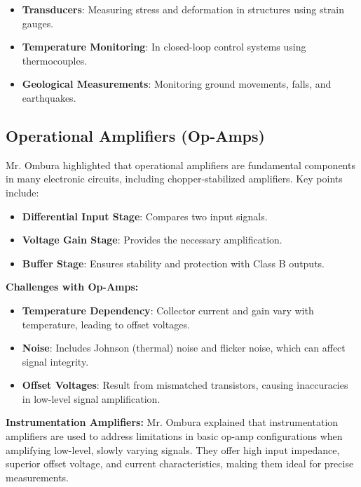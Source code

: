 \documentclass[a4paper,9pt,twoside,openany,twocolumn]{memoir}
\begin{document}
\begin{itemize}
    \item \textbf{Transducers}: Measuring stress and deformation in structures using strain gauges.
    \item \textbf{Temperature Monitoring}: In closed-loop control systems using thermocouples.
    \item \textbf{Geological Measurements}: Monitoring ground movements, falls, and earthquakes.
\end{itemize}

\subsection{Operational Amplifiers (Op-Amps)}
Mr. Ombura highlighted that operational amplifiers are fundamental components in many electronic circuits, including chopper-stabilized amplifiers. Key points include:

\begin{itemize}[itemsep=0pt, topsep=2pt, leftmargin=4mm]
    \item \textbf{Differential Input Stage}: Compares two input signals.
    \item \textbf{Voltage Gain Stage}: Provides the necessary amplification.
    \item \textbf{Buffer Stage}: Ensures stability and protection with Class B outputs.
\end{itemize}

\textbf{Challenges with Op-Amps:}
\begin{itemize}[itemsep=0pt, topsep=2pt, leftmargin=4mm]
    \item \textbf{Temperature Dependency}: Collector current and gain vary with temperature, leading to offset voltages.
    \item \textbf{Noise}: Includes Johnson (thermal) noise and flicker noise, which can affect signal integrity.
    \item \textbf{Offset Voltages}: Result from mismatched transistors, causing inaccuracies in low-level signal amplification.
\end{itemize}

\textbf{Instrumentation Amplifiers:} Mr. Ombura explained that instrumentation amplifiers are used to address limitations in basic op-amp configurations when amplifying low-level, slowly varying signals. They offer high input impedance, superior offset voltage, and current characteristics, making them ideal for precise measurements.
\end{document}
